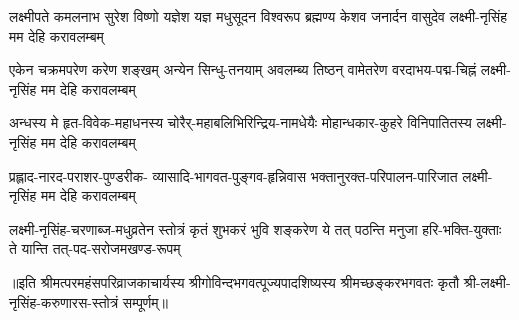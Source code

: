 \fourlineindentedshloka
{लक्ष्मीपते कमलनाभ सुरेश विष्णो}
{यज्ञेश यज्ञ मधुसूदन विश्वरूप}
{ब्रह्मण्य केशव जनार्दन वासुदेव}
{लक्ष्मी-नृसिंह मम देहि करावलम्बम्}

\fourlineindentedshloka
{एकेन चक्रमपरेण करेण शङ्खम्}
{अन्येन सिन्धु-तनयाम् अवलम्ब्य तिष्ठन्}
{वामेतरेण वरदाभय-पद्म-चिह्नं}
{लक्ष्मी-नृसिंह मम देहि करावलम्बम्}

\fourlineindentedshloka
{अन्धस्य मे हृत-विवेक-महाधनस्य}
{चोरैर्-महाबलिभिरिन्द्रिय-नामधेयैः}
{मोहान्धकार-कुहरे विनिपातितस्य}
{लक्ष्मी-नृसिंह मम देहि करावलम्बम्}

\fourlineindentedshloka
{प्रह्लाद-नारद-पराशर-पुण्डरीक-}
{व्यासादि-भागवत-पुङ्गव-हृन्निवास}
{भक्तानुरक्त-परिपालन-पारिजात}
{लक्ष्मी-नृसिंह मम देहि करावलम्बम्}

\fourlineindentedshloka
{लक्ष्मी-नृसिंह-चरणाब्ज-मधुव्रतेन}
{स्तोत्रं कृतं शुभकरं भुवि शङ्करेण}
{ये तत् पठन्ति मनुजा हरि-भक्ति-युक्ताः}
{ते यान्ति तत्-पद-सरोजमखण्ड-रूपम्}


॥इति श्रीमत्परमहंसपरिव्राजकाचार्यस्य श्रीगोविन्दभगवत्पूज्यपादशिष्यस्य 
श्रीमच्छङ्करभगवतः कृतौ श्री-लक्ष्मी-नृसिंह-करुणारस-स्तोत्रं सम्पूर्णम्‌॥
